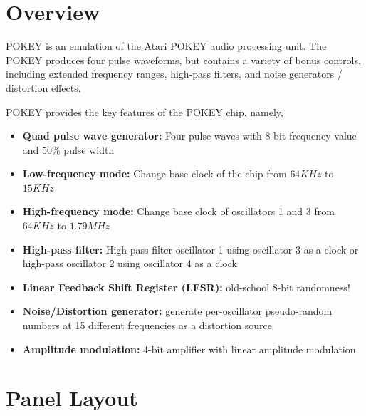 \documentclass[12pt,letter]{article}
\begin{document}


\section{Overview}

POKEY is an emulation of the Atari POKEY audio processing unit. The POKEY
produces four pulse waveforms, but contains a variety of bonus controls,
including extended frequency ranges, high-pass filters, and noise generators /
distortion effects.

POKEY provides the key features of the POKEY chip, namely,
\begin{itemize}
  \item \textbf{Quad pulse wave generator:} Four pulse waves with 8-bit frequency value and $50\%$ pulse width
  \item \textbf{Low-frequency mode:} Change base clock of the chip from $64 KHz$ to $15 KHz$
  \item \textbf{High-frequency mode:} Change base clock of oscillators 1 and 3 from $64 KHz$ to $1.79 MHz$
  \item \textbf{High-pass filter:} High-pass filter oscillator 1 using oscillator 3 as a clock or high-pass oscillator 2 using oscillator 4 as a clock
  \item \textbf{Linear Feedback Shift Register (LFSR):} old-school 8-bit randomness!
  \item \textbf{Noise/Distortion generator:} generate per-oscillator pseudo-random numbers at 15 different frequencies as a distortion source
  \item \textbf{Amplitude modulation:} 4-bit amplifier with linear amplitude modulation
\end{itemize}


\clearpage
\section{Panel Layout}
\end{document}
